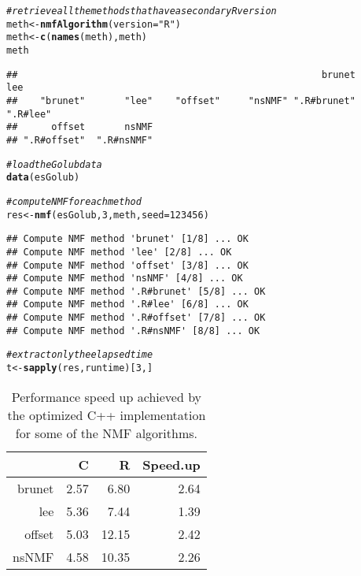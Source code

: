 \documentclass[a4paper]{article}\usepackage[]{graphicx}\usepackage[]{color}
\makeatletter
\newcommand{\hlnum}[1]{\textcolor[rgb]{0.686,0.059,0.569}{#1}}%
\newcommand{\hlstr}[1]{\textcolor[rgb]{0.192,0.494,0.8}{#1}}%
\newcommand{\hlcom}[1]{\textcolor[rgb]{0.678,0.584,0.686}{\textit{#1}}}%
\newcommand{\hlstd}[1]{\textcolor[rgb]{0.345,0.345,0.345}{#1}}%
\newcommand{\hlkwb}[1]{\textcolor[rgb]{0.69,0.353,0.396}{#1}}%
\newcommand{\hlkwc}[1]{\textcolor[rgb]{0.333,0.667,0.333}{#1}}%
\newcommand{\hlkwd}[1]{\textcolor[rgb]{0.737,0.353,0.396}{\textbf{#1}}}%
\newenvironment{kframe}{%
 \def\at@end@of@kframe{}%
 \ifinner\ifhmode%
  \def\at@end@of@kframe{\end{minipage}}%
  \begin{minipage}{\columnwidth}%
 \fi\fi%
 \def\FrameCommand##1{\hskip\@totalleftmargin \hskip-\fboxsep
 \colorbox{shadecolor}{##1}\hskip-\fboxsep
     \hskip-\linewidth \hskip-\@totalleftmargin \hskip\columnwidth}%
 \MakeFramed {\advance\hsize-\width
   \@totalleftmargin\z@ \linewidth\hsize
   \@setminipage}}%
 {\par\unskip\endMakeFramed%
 \at@end@of@kframe}
\newenvironment{knitrout}{}{} %
\makeatother
\begin{document}
\begin{knitrout}
\color{fgcolor}\begin{kframe}
\begin{alltt}
\hlcom{# retrieve all the methods that have a secondary R version}
\hlstd{meth} \hlkwb{<-} \hlkwd{nmfAlgorithm}\hlstd{(}\hlkwc{version} \hlstd{=} \hlstr{"R"}\hlstd{)}
\hlstd{meth} \hlkwb{<-} \hlkwd{c}\hlstd{(}\hlkwd{names}\hlstd{(meth), meth)}
\hlstd{meth}
\end{alltt}
\begin{verbatim}
##                                                      brunet         lee 
##    "brunet"       "lee"    "offset"     "nsNMF" ".R#brunet"    ".R#lee" 
##      offset       nsNMF 
## ".R#offset"  ".R#nsNMF"
\end{verbatim}
\begin{alltt}
\hlcom{# load the Golub data}
\hlkwd{data}\hlstd{(esGolub)}

\hlcom{# compute NMF for each method}
\hlstd{res} \hlkwb{<-} \hlkwd{nmf}\hlstd{(esGolub,} \hlnum{3}\hlstd{, meth,} \hlkwc{seed} \hlstd{=} \hlnum{123456}\hlstd{)}
\end{alltt}
\begin{verbatim}
## Compute NMF method 'brunet' [1/8] ... OK
## Compute NMF method 'lee' [2/8] ... OK
## Compute NMF method 'offset' [3/8] ... OK
## Compute NMF method 'nsNMF' [4/8] ... OK
## Compute NMF method '.R#brunet' [5/8] ... OK
## Compute NMF method '.R#lee' [6/8] ... OK
## Compute NMF method '.R#offset' [7/8] ... OK
## Compute NMF method '.R#nsNMF' [8/8] ... OK
\end{verbatim}
\begin{alltt}
\hlcom{# extract only the elapsed time}
\hlstd{t} \hlkwb{<-} \hlkwd{sapply}\hlstd{(res, runtime)[}\hlnum{3}\hlstd{, ]}
\end{alltt}
\end{kframe}
\end{knitrout}


\begin{table}[ht]
\centering
\begin{tabular}{rrrr}
  \hline
 & C & R & Speed.up \\ 
  \hline
brunet & 2.57 & 6.80 & 2.64 \\ 
  lee & 5.36 & 7.44 & 1.39 \\ 
  offset & 5.03 & 12.15 & 2.42 \\ 
  nsNMF & 4.58 & 10.35 & 2.26 \\ 
   \hline
\end{tabular}
\caption{Performance speed up achieved by the optimized C++ implementation for some of the NMF algorithms.} 
\label{tab:perf}
\end{table}
\end{document}
